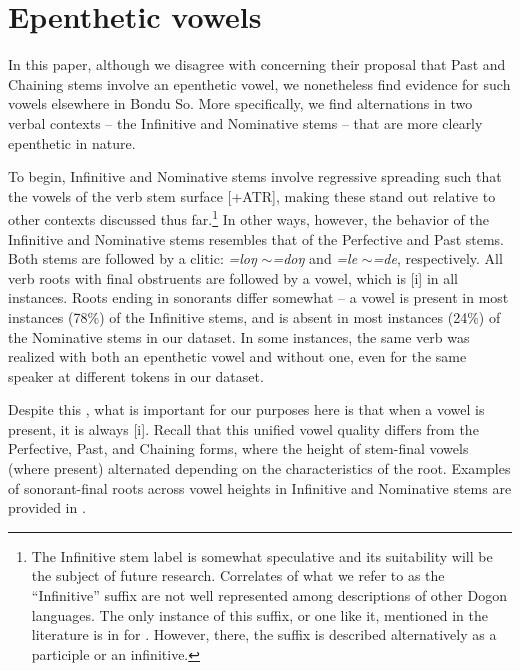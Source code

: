 \documentclass[output=paper,colorlinks,citecolor=brown]{langscibook}
\begin{document}
\section{Epenthetic vowels}
\label{sec-epenth}

In this paper, although we disagree with \citet{GreenHantgan} concerning their proposal that Past and Chaining stems involve an epenthetic vowel, we nonetheless find evidence for such vowels elsewhere in Bondu So. More specifically, we find alternations in two verbal contexts -- the Infinitive and Nominative stems -- that are more clearly epenthetic in nature. 

To begin, Infinitive and Nominative stems involve regressive spreading such that the vowels of the verb stem surface [+ATR], making these stand out relative to other contexts discussed thus far.\footnote{The Infinitive stem label is somewhat speculative and its suitability will be the subject of future research. Correlates of what we refer to as the ``Infinitive'' suffix are not well represented among descriptions of other Dogon languages. The only instance of this suffix, or one like it, mentioned in the literature is in \citet[120]{Culy1994} for . However, there, the suffix is described alternatively as a participle or an infinitive.} In other ways, however, the behavior of the Infinitive and Nominative stems resembles that of the Perfective and Past stems. Both stems are followed by a  clitic: \textit{=loŋ} $\sim$\textit{=doŋ} and \textit{=le} $\sim$\textit{=de}, respectively. All verb roots with final obstruents are followed by a vowel, which is [i] in all instances. Roots ending in sonorants differ somewhat -- a vowel is present in most instances (78\%) of the Infinitive stems, and is absent in most instances (24\%) of the Nominative stems in our dataset. In some instances, the same verb was realized with both an epenthetic vowel and without one, even for the same speaker at different tokens in our dataset. 

Despite this , what is important for our purposes here is that when a vowel is present, it is always [i]. Recall that this unified vowel quality differs from the Perfective, Past, and Chaining forms, where the height of stem-final vowels (where present) alternated depending on the characteristics of the root. Examples of sonorant-final roots across vowel heights in Infinitive and Nominative stems are provided in .
\end{document}
